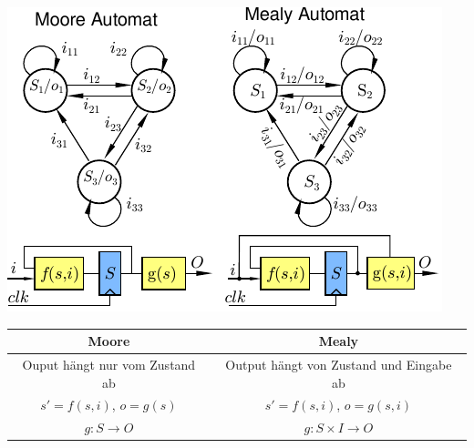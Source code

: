 \documentclass[6pt,a4paper]{scrartcl}
\newcommand{\ra}[0]{\ensuremath{\rightarrow}} 									%
\begin{document}
\begin{multicols*}{3}
\includegraphics{./img/ds/automaten.pdf}\\


\begin{tabular}{c | c}
 Moore & Mealy \\ \hline
 Ouput hängt nur vom Zustand ab & Output hängt von Zustand und Eingabe ab\\
 $s'=f(s,i)$, $o=g(s)$ &  $s'=f(s,i)$, $o=g(s,i)$ \\
 $g: S \ra O$ & $g: S \times I \ra O$
\end{tabular}

\end{multicols*}
\end{document}
